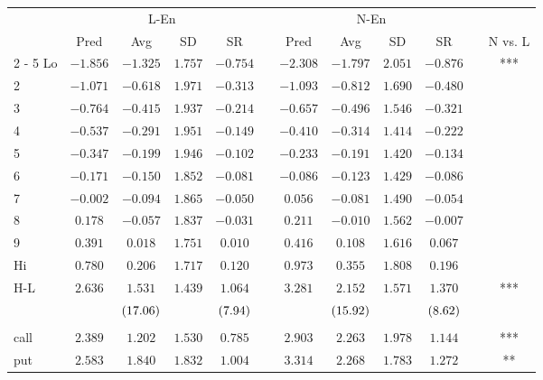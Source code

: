 \begin{tabular}{@{}lccccccccccc@{}}%
\toprule%
&\multicolumn{4}{c}{L{-}En}&&\multicolumn{4}{c}{N{-}En}&&\\%
\multicolumn{1}{c}{}&\multicolumn{1}{c}{Pred}&\multicolumn{1}{c}{Avg}&\multicolumn{1}{c}{SD}&\multicolumn{1}{c}{SR}&\multicolumn{1}{c}{}&\multicolumn{1}{c}{Pred}&\multicolumn{1}{c}{Avg}&\multicolumn{1}{c}{SD}&\multicolumn{1}{c}{SR}&\multicolumn{1}{c}{}&\multicolumn{1}{c}{N vs. L}\\%
\cmidrule{2%
-%
5}%
\cmidrule{7%
-%
10}%
\cmidrule{12%
-%
12}%
Lo&$-1.856$&$-1.325$&$1.757$&$-0.754$&&$-2.308$&$-1.797$&$2.051$&$-0.876$&&***\\%
2&$-1.071$&$-0.618$&$1.971$&$-0.313$&&$-1.093$&$-0.812$&$1.690$&$-0.480$&&\\%
3&$-0.764$&$-0.415$&$1.937$&$-0.214$&&$-0.657$&$-0.496$&$1.546$&$-0.321$&&\\%
4&$-0.537$&$-0.291$&$1.951$&$-0.149$&&$-0.410$&$-0.314$&$1.414$&$-0.222$&&\\%
5&$-0.347$&$-0.199$&$1.946$&$-0.102$&&$-0.233$&$-0.191$&$1.420$&$-0.134$&&\\%
6&$-0.171$&$-0.150$&$1.852$&$-0.081$&&$-0.086$&$-0.123$&$1.429$&$-0.086$&&\\%
7&$-0.002$&$-0.094$&$1.865$&$-0.050$&&$0.056$&$-0.081$&$1.490$&$-0.054$&&\\%
8&$0.178$&$-0.057$&$1.837$&$-0.031$&&$0.211$&$-0.010$&$1.562$&$-0.007$&&\\%
9&$0.391$&$0.018$&$1.751$&$0.010$&&$0.416$&$0.108$&$1.616$&$0.067$&&\\%
Hi&$0.780$&$0.206$&$1.717$&$0.120$&&$0.973$&$0.355$&$1.808$&$0.196$&&\\%
\midrule%
H{-}L&$2.636$&$1.531$&$1.439$&$1.064$&&$3.281$&$2.152$&$1.571$&$1.370$&&***\\%
&&$\footnotesize{(17.06)}$&&$\footnotesize{(7.94)}$&&&$\footnotesize{(15.92)}$&&$\footnotesize{(8.62)}$&&\\%
&&&&&&&&&&&\\%
call&$2.389$&$1.202$&$1.530$&$0.785$&&$2.903$&$2.263$&$1.978$&$1.144$&&***\\%
put&$2.583$&$1.840$&$1.832$&$1.004$&&$3.314$&$2.268$&$1.783$&$1.272$&&**\\\bottomrule%
%
\end{tabular}